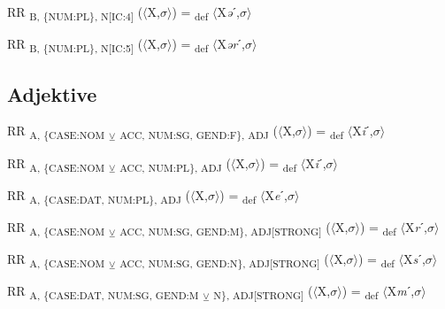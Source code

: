 {\begin{exe}
 RR \textsubscript{B, \{NUM:PL\}, N[IC:4]} ($\langle$X,$\sigma $$\rangle$) = \textsubscript{def} $\langle$X\textit{ə}ˊ,$\sigma $$\rangle$
\end{exe}

\begin{exe}
 RR \textsubscript{B, \{NUM:PL\}, N[IC:5]} ($\langle$X,$\sigma $$\rangle$) = \textsubscript{def} $\langle$X\textit{ər}ˊ,$\sigma $$\rangle$
\end{exe}

\subsection{Adjektive}

\begin{exe}
 RR \textsubscript{A, \{CASE:NOM} \textsubscript{${\veebar}$}\textsubscript{ ACC, NUM:SG, GEND:F\}, ADJ} ($\langle$X,$\sigma $$\rangle$) = \textsubscript{def} $\langle$X\textit{i}ˊ,$\sigma $$\rangle$
\end{exe}

\begin{exe}
 RR \textsubscript{A, \{CASE:NOM} \textsubscript{${\veebar}$}\textsubscript{ ACC, NUM:PL\}, ADJ} ($\langle$X,$\sigma $$\rangle$) = \textsubscript{def} $\langle$X\textit{i}ˊ,$\sigma $$\rangle$
\end{exe}

\begin{exe}
 RR \textsubscript{A, \{CASE:DAT, NUM:PL\}, ADJ} ($\langle$X,$\sigma $$\rangle$) = \textsubscript{def} $\langle$X\textit{e}ˊ,$\sigma $$\rangle$
\end{exe}

\begin{exe}
 RR \textsubscript{A, \{CASE:NOM} \textsubscript{${\veebar}$}\textsubscript{ ACC, NUM:SG, GEND:M\}, ADJ[STRONG]} ($\langle$X,$\sigma $$\rangle$) = \textsubscript{def} $\langle$X\textit{r}ˊ,$\sigma $$\rangle$
\end{exe}

\begin{exe}
 RR \textsubscript{A, \{CASE:NOM} \textsubscript{${\veebar}$}\textsubscript{ ACC, NUM:SG, GEND:N\}, ADJ[STRONG]} ($\langle$X,$\sigma $$\rangle$) = \textsubscript{def} $\langle$X\textit{s}ˊ,$\sigma $$\rangle$
\end{exe}

\begin{exe}
 RR \textsubscript{A, \{CASE:DAT, NUM:SG, GEND:M} \textsubscript{${\veebar}$}\textsubscript{ N\}, ADJ[STRONG]} ($\langle$X,$\sigma $$\rangle$) = \textsubscript{def} $\langle$X\textit{m}ˊ,$\sigma $$\rangle$
\end{exe}

}
